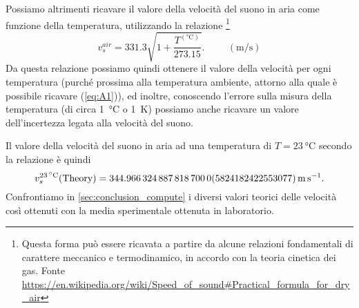 \documentclass[
    prl,
    reprint, 
    superscriptaddress, 
    altaffilletter, 
    amsmath, 
    amssymb, 
    a4paper,
    varvw]{revtex4-2}
\begin{document}
Possiamo altrimenti ricavare il valore della velocità del suono in aria come funzione della temperatura, utilizzando la relazione \footnote{Questa forma può essere ricavata a partire da alcune relazioni fondamentali di carattere meccanico e termodinamico, in accordo con la teoria cinetica dei gas. Fonte \url{https://en.wikipedia.org/wiki/Speed_of_sound\#Practical_formula_for_dry_air}}\begin{equation}
    v_s^{air} = 331.3\sqrt{1+\frac{T^{(\si{\celsius})}}{273.15}}.\hspace{1cm}(\si{\metre\per\second})\label{eq:A1}
\end{equation} Da questa relazione possiamo quindi ottenere il valore della velocità per ogni temperatura (purché prossima alla temperatura ambiente, attorno alla quale è possibile ricavare (\ref{eq:A1})), ed inoltre, conoscendo l'errore sulla misura della temperatura (di circa \SI{1}{\celsius} o \SI{1}{\kelvin}) possiamo anche ricavare un valore dell'incertezza legata alla velocità del suono. 

Il valore della velocità del suono in aria ad una temperatura di $T=\SI{23}{\celsius}$  secondo la relazione  è quindi \[v_s^{\SI{23}{\celsius}}(\text{Theory})=\SI{344.9663248878187 +- 0.5824182422553077}{\metre\per\second}.\] Confrontiamo in \ref{sec:conclusion_compute} i diversi valori teorici delle velocità così ottenuti con la media sperimentale ottenuta in laboratorio. 

\setcounter{table}{0}
\renewcommand{\thetable}{A-\Roman{table}}
\end{document}
